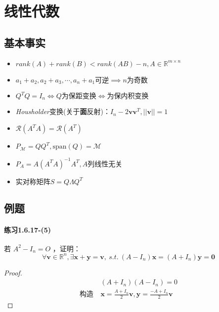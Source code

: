 \documentclass[11pt,a4paper,oneside,fontset=windows]{ctexbook}
\begin{document}
\chapter{线性代数}
\section{基本事实}
\begin{itemize}
  \item \( rank(A)+rank(B)<rank(AB)-n,A\in \mathbb{R}^{m\times n} \)
  \item  \( a_1+a_2,a_2+a_3,\cdots,a_n+a_1 \text{可逆}\implies n\text{为奇数} \)
  \item \( Q^TQ=I_n\iff Q\text{为保距变换}\iff \text{为保内积变换}\)
  \item \textit{Housholder}变换(关于\textbf{面}反射)：\( I_n-2\bm{vv}^T,||\bm{v}||=1 \)
  \item \( \mathcal{R}(A^TA)=\mathcal{R}(A^T)\)
  \item \( P_{\mathcal{M}}=QQ^T,\text{span}(Q)=\mathcal{M} \)
  \item \( P_{A}=A(A^TA)^{-1}A^T,A \)列线性无关
  \item 实对称矩阵\( S=Q\Lambda Q^T \)
\end{itemize}
\section{例题}
\subsubsection{练习1.6.17-(5)}
若 $A^2-I_n=O$ ，证明：
\begin{equation*}
  \forall \bm{v}\in \mathbb{R}^n, \exists \bm{x}+\bm{y}=\bm{v},\ s.t.\ (A-I_n)\bm{x}=(A+I_n)\bm{y}=\bm{0}
\end{equation*}
\begin{proof}
  \begin{align*}
                  & (A+I_n)(A-I_n)=0                                           \\
    \text{构造}\  & \bm{x}=\frac{A+I_n}{2}\bm{v},\bm{y}=\frac{-A+I_n}{2}\bm{v}
  \end{align*}
\end{proof}
\end{document}
